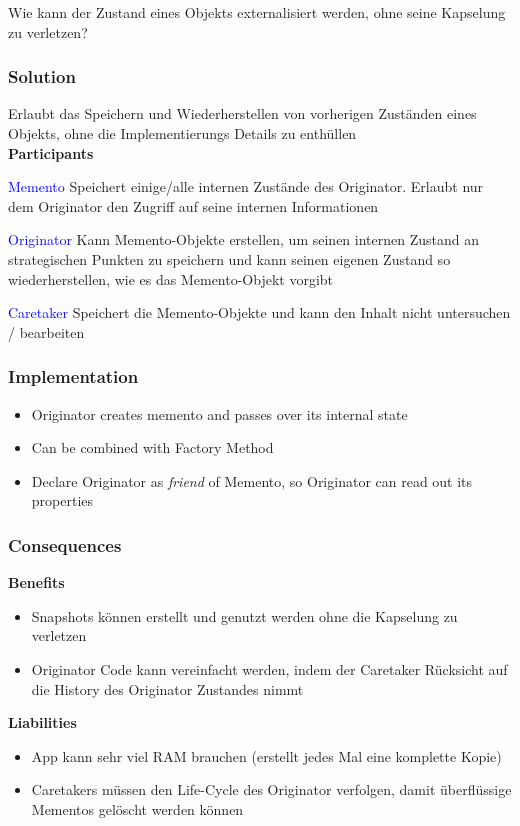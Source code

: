 Wie kann der Zustand eines Objekts externalisiert werden, ohne seine Kapselung zu verletzen?

\subsubsection{Solution}

Erlaubt das Speichern und Wiederherstellen von vorherigen Zuständen eines Objekts, ohne die Implementierungs Details zu enthüllen \\

\textbf{Participants}

\textcolor{blue}{Memento} Speichert einige/alle internen Zustände des Originator. Erlaubt nur dem Originator den Zugriff auf seine internen Informationen

\textcolor{blue}{Originator} Kann Memento-Objekte erstellen, um seinen internen Zustand an strategischen Punkten zu speichern und kann seinen eigenen Zustand so wiederherstellen, wie es das Memento-Objekt vorgibt

\textcolor{blue}{Caretaker} Speichert die Memento-Objekte und kann den Inhalt nicht untersuchen / bearbeiten

\subsubsection{Implementation}
\begin{itemize}
    \item Originator creates memento and passes over its internal state
    \item Can be combined with Factory Method
    \item Declare Originator as \textit{friend} of Memento, so Originator can read out its properties
\end{itemize}

\subsubsection{Consequences}
\textbf{Benefits}
\begin{itemize}
    \item Snapshots können erstellt und genutzt werden ohne die Kapselung zu verletzen
    \item Originator Code kann vereinfacht werden, indem der Caretaker Rücksicht auf die History des Originator Zustandes nimmt
\end{itemize}
\textbf{Liabilities}
\begin{itemize}
    \item App kann sehr viel RAM brauchen (erstellt jedes Mal eine komplette Kopie)
    \item Caretakers müssen den Life-Cycle des Originator verfolgen, damit überflüssige Mementos
    gelöscht werden können
\end{itemize}

